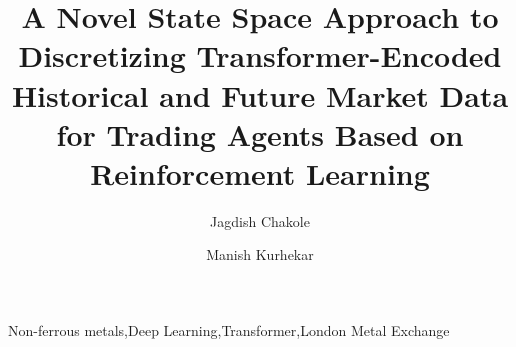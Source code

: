 \documentclass[preprint,review,12pt]{elsarticle}
\begin{document}
\begin{frontmatter}



\title{A Novel State Space Approach to Discretizing Transformer-Encoded Historical and Future Market Data for Trading Agents Based on Reinforcement Learning}

 \author[label1]{Jagdish Chakole}
 \author[label2]{Manish Kurhekar}

\begin{abstract}
 
\end{abstract}



\begin{keyword}
	Non-ferrous metals\sep Deep Learning\sep Transformer\sep London Metal Exchange



\end{keyword}

\end{frontmatter}
\end{document}
